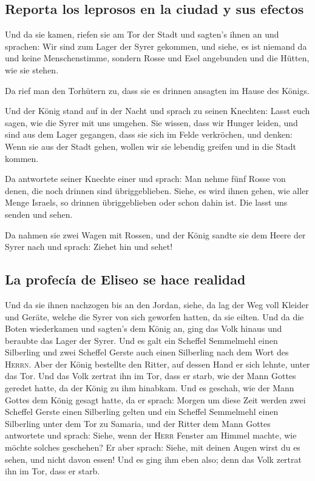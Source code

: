 \hypertarget{reporta-los-leprosos-en-la-ciudad-y-sus-efectos}{%
\subsection{Reporta los leprosos en la ciudad y sus
efectos}\label{reporta-los-leprosos-en-la-ciudad-y-sus-efectos}}

 Und da sie kamen, riefen sie am Tor der Stadt und
sagten's ihnen an und sprachen: Wir sind zum Lager der Syrer gekommen,
und siehe, es ist niemand da und keine Menschenstimme, sondern Rosse und
Esel angebunden und die Hütten, wie sie stehen.

 Da rief man den Torhütern zu, dass sie es drinnen
ansagten im Hause des Königs.

 Und der König stand auf in der Nacht und sprach zu
seinen Knechten: Lasst euch sagen, wie die Syrer mit uns umgehen. Sie
wissen, dass wir Hunger leiden, und sind aus dem Lager gegangen, dass
sie sich im Felde verkröchen, und denken: Wenn sie aus der Stadt gehen,
wollen wir sie lebendig greifen und in die Stadt kommen.

 Da antwortete seiner Knechte einer und sprach: Man nehme
fünf Rosse von denen, die noch drinnen sind übriggeblieben. Siehe, es
wird ihnen gehen, wie aller Menge Israels, so drinnen übriggeblieben
oder schon dahin ist. Die lasst uns senden und sehen.

 Da nahmen sie zwei Wagen mit Rossen, und der König
sandte sie dem Heere der Syrer nach und sprach: Ziehet hin und sehet!

\hypertarget{la-profecuxeda-de-eliseo-se-hace-realidad}{%
\subsection{La profecía de Eliseo se hace
realidad}\label{la-profecuxeda-de-eliseo-se-hace-realidad}}

 Und da sie ihnen nachzogen bis an den Jordan, siehe, da
lag der Weg voll Kleider und Geräte, welche die Syrer von sich geworfen
hatten, da sie eilten. Und da die Boten wiederkamen und sagten's dem
König an,  ging das Volk hinaus und beraubte das Lager
der Syrer. Und es galt ein Scheffel Semmelmehl einen Silberling und zwei
Scheffel Gerste auch einen Silberling nach dem Wort des \textsc{Herrn}.
 Aber der König bestellte den Ritter, auf dessen Hand er
sich lehnte, unter das Tor. Und das Volk zertrat ihn im Tor, dass er
starb, wie der Mann Gottes geredet hatte, da der König zu ihm hinabkam.
 Und es geschah, wie der Mann Gottes dem König gesagt
hatte, da er sprach: Morgen um diese Zeit werden zwei Scheffel Gerste
einen Silberling gelten und ein Scheffel Semmelmehl einen Silberling
unter dem Tor zu Samaria,  und der Ritter dem Mann Gottes
antwortete und sprach: Siehe, wenn der \textsc{Herr} Fenster am Himmel
machte, wie möchte solches geschehen? Er aber sprach: Siehe, mit deinen
Augen wirst du es sehen, und nicht davon essen!  Und es
ging ihm eben also; denn das Volk zertrat ihn im Tor, dass er starb.

